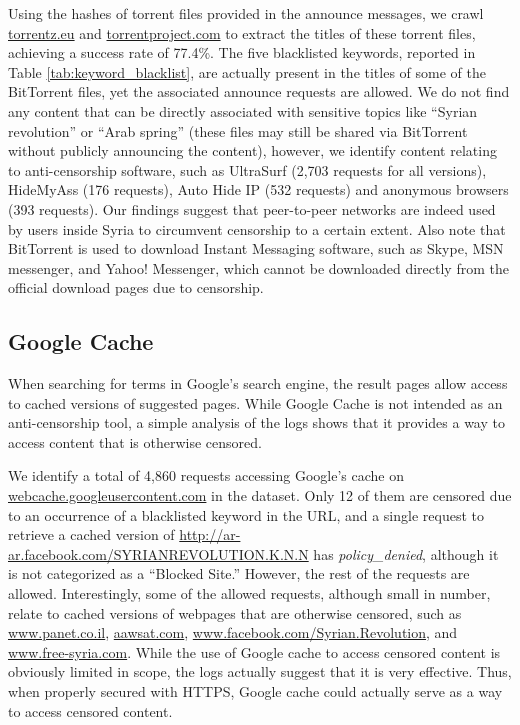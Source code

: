 \documentclass{sig-alternate-2013}
\def\df{\xspace}
\newcommand{\policydenied}{\emph{policy\_denied}\xspace}
\begin{document}
Using the hashes of torrent files provided in the announce messages, we crawl  \url{torrentz.eu} and \url{torrentproject.com} to extract the titles of these torrent files, achieving a success rate of 77.4\%. 
The five blacklisted keywords, reported in Table \ref{tab:keyword_blacklist}, are actually present in the titles of some of the BitTorrent files, yet the associated announce requests are allowed. We do not find any content that can be directly associated with sensitive topics like ``Syrian revolution'' or ``Arab spring'' (these files may still be shared via BitTorrent without publicly announcing the content), however, we identify content relating to anti-censorship software, such as UltraSurf (2,703 requests for all versions), HideMyAss (176 requests), Auto Hide IP (532 requests) and anonymous browsers (393 requests). Our findings suggest that peer-to-peer networks are indeed used by users inside Syria to circumvent censorship to a certain extent. Also note that BitTorrent is used to download Instant Messaging software, such as Skype, MSN messenger, and Yahoo! Messenger, which cannot be downloaded directly from the official download pages due to censorship.

\subsection{Google Cache}

When searching for terms in Google's search engine, the result pages allow access to  cached versions of suggested pages.  While Google Cache is not intended as an anti-censorship tool, a simple analysis of the logs shows that it provides a way to access content that is otherwise censored. 

We identify a total of 4,860 requests accessing Google's cache on  \url{webcache.googleusercontent.com} in the \df dataset. Only 12 of them are censored due to an occurrence of a blacklisted keyword in the URL, and a single request to retrieve a cached version of \url{http://ar-ar.facebook.com/SYRIANREVOLUTION.K.N.N} has \policydenied, although it is not categorized as a ``Blocked Site.'' However, the rest of the requests are allowed. Interestingly, some of the allowed requests, although small in number, relate to cached versions of webpages that are otherwise censored, such as \url{www.panet.co.il}, \url{aawsat.com}, \url{www.facebook.com/Syrian.Revolution}, and \url{www.free-syria.com}. 
While the use of Google cache to access censored content is obviously limited in scope, the logs actually suggest that it is very effective. Thus, when properly secured with HTTPS, Google cache could actually serve as a way to access censored content.
\end{document}
